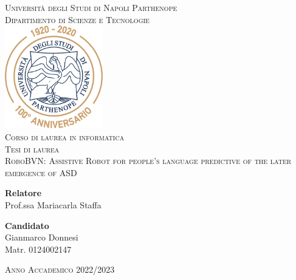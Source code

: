 \documentclass[a4paper, 12pt]{report}
\newcommand\blankpage{%
    \null
    \thispagestyle{empty}%
    \newpage}
\begin{document}
    \begin{titlepage}
        \begin{center}
	        \textsc{\Large {Università degli Studi di Napoli Parthenope\\}}
	        \vspace{0,7cm}
	        \textsc{\large {Dipartimento di Scienze e Tecnologie\\}}
	        \vspace{1cm}
	        \includegraphics[width=0.32\textwidth]{immagini/logo.png}\\
	        \vspace{0,7cm}
	        \textsc{\large {Corso di laurea in informatica\\}}
	        \vspace{0,3cm}
	        \textsc{\large {Tesi di laurea\\}}
	        \vspace{1,4cm}
	        \textsc{\Large {RoboBVN: Assistive Robot for people’s language predictive of the later emergence of ASD\\}}
	        \vspace{2,5cm}
	    \end{center}
        \begin{minipage}[t]{.49\textwidth}
            \textbf{\large{Relatore}}\\
            \large{Prof.ssa Mariacarla Staffa}
            \vspace{0,7cm}
        \end{minipage}\hfill
        \begin{minipage}[t]{.49\textwidth}
            \hfill\textbf{\large{Candidato}}\\
            \hbox{}\hfill\large{Gianmarco Donnesi}\\
            \hbox{}\hfill\large{Matr. \scshape 0124002147}
        \end{minipage}
        \vspace{1,6cm}
	    {\begin{center}
	        \textsc{{Anno Accademico 2022/2023}}
	    \end{center}}
      \afterpage{\blankpage}
	\end{titlepage}
	\newpage
	\begin{flushright}
	\fontsize{12}{18}
	\end{flushright}
    \afterpage{\blankpage}
    \fontsize{12}{18}\selectfont{\tableofcontents}
    \newpage
    \cleardoublepage
    \listoffigures
    \afterpage{\blankpage}
   
\end{document}
